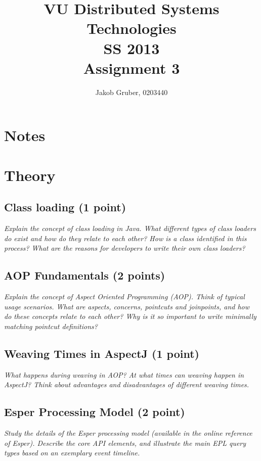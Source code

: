 \documentclass[a4paper,10pt]{article}
\title{VU Distributed Systems Technologies \\
       SS 2013 \\
       Assignment 3}
\author{Jakob Gruber, 0203440}
\begin{document}
\maketitle

\section{Notes}

\section{Theory}

\subsection{Class loading (1 point)}

\emph{Explain the concept of class loading in Java. What different types of class loaders do exist and how do
they relate to each other? How is a class identified in this process? What are the reasons for developers
to write their own class loaders?}

\vspace{3mm}

\subsection{AOP Fundamentals (2 points)}

\emph{Explain the concept of Aspect Oriented Programming (AOP). Think of typical usage scenarios. What
are aspects, concerns, pointcuts and joinpoints, and how do these concepts relate to each other?
Why is it so important to write minimally matching pointcut definitions?}

\vspace{3mm}

\subsection{Weaving Times in AspectJ (1 point)}

\emph{What happens during weaving in AOP? At what times can weaving happen in AspectJ? Think about
advantages and disadvantages of different weaving times.}

\vspace{3mm}

\subsection{Esper Processing Model (2 point)}

\emph{Study the details of the Esper processing model (available in the online reference of Esper). Describe the
core API elements, and illustrate the main EPL query types based on an exemplary event timeline.}

\vspace{3mm}
\end{document}
